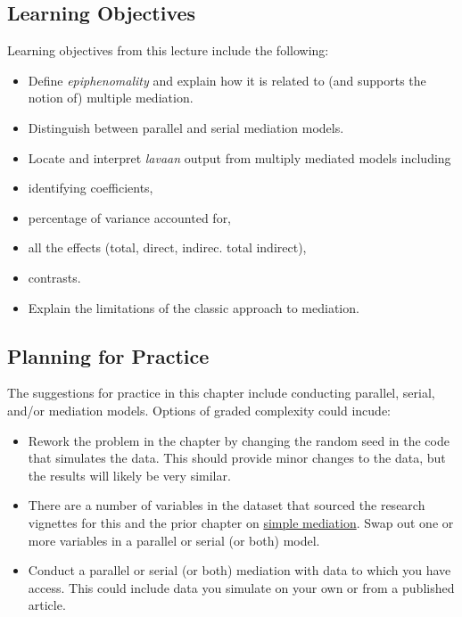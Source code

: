 \documentclass[
  11pt,
]{book}
\providecommand{\tightlist}{%
  \setlength{\itemsep}{0pt}\setlength{\parskip}{0pt}}
\begin{document}
\hypertarget{learning-objectives-5}{%
\subsection{Learning Objectives}\label{learning-objectives-5}}

Learning objectives from this lecture include the following:

\begin{itemize}
\tightlist
\item
  Define \emph{epiphenomality} and explain how it is related to (and supports the notion of) multiple mediation.
\item
  Distinguish between parallel and serial mediation models.
\item
  Locate and interpret \emph{lavaan} output from multiply mediated models including
\item
  identifying coefficients,
\item
  percentage of variance accounted for,\\
\item
  all the effects (total, direct, indirec. total indirect),
\item
  contrasts.
\item
  Explain the limitations of the classic approach \citep{baron_moderator-mediator_1986} to mediation.
\end{itemize}

\hypertarget{planning-for-practice-5}{%
\subsection{Planning for Practice}\label{planning-for-practice-5}}

The suggestions for practice in this chapter include conducting parallel, serial, and/or mediation models. Options of graded complexity could incude:

\begin{itemize}
\tightlist
\item
  Rework the problem in the chapter by changing the random seed in the code that simulates the data. This should provide minor changes to the data, but the results will likely be very similar.
\item
  There are a number of variables in the dataset that sourced the research vignettes for this and the prior chapter on \protect\hyperlink{SimpleMed}{simple mediation}. Swap out one or more variables in a parallel or serial (or both) model.
\item
  Conduct a parallel or serial (or both) mediation with data to which you have access. This could include data you simulate on your own or from a published article.
\end{itemize}
\end{document}
